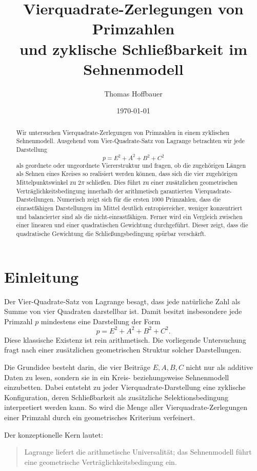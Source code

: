 \documentclass[11pt,a4paper]{article}
\title{Vierquadrate-Zerlegungen von Primzahlen\\
	und zyklische Schließbarkeit im Sehnenmodell}
\author{Thomas Hoffbauer}
\date{\today}
\theoremstyle{remark}
\begin{document}
	\maketitle
	
	\begin{abstract}
		Wir untersuchen Vierquadrate-Zerlegungen von Primzahlen in einem zyklischen Sehnenmodell. 
		Ausgehend vom Vier-Quadrate-Satz von Lagrange betrachten wir jede Darstellung
		\[
		p = E^2 + A^2 + B^2 + C^2
		\]
		als geordnete oder ungeordnete Viererstruktur und fragen, ob die zugehörigen Längen als Sehnen eines Kreises so realisiert werden können, dass sich die vier zugehörigen Mittelpunktswinkel zu \(2\pi\) schließen. 
		Dies führt zu einer zusätzlichen geometrischen Verträglichkeitsbedingung innerhalb der arithmetisch garantierten Vierquadrate-Darstellungen. 
		Numerisch zeigt sich für die ersten 1000 Primzahlen, dass die einrastfähigen Darstellungen im Mittel deutlich entropiereicher, weniger konzentriert und balancierter sind als die nicht-einrastfähigen. 
		Ferner wird ein Vergleich zwischen einer linearen und einer quadratischen Gewichtung durchgeführt. Dieser zeigt, dass die quadratische Gewichtung die Schließungsbedingung spürbar verschärft.
	\end{abstract}
	
	\section{Einleitung}
	
	Der Vier-Quadrate-Satz von Lagrange besagt, dass jede natürliche Zahl als Summe von vier Quadraten darstellbar ist. 
	Damit besitzt insbesondere jede Primzahl \(p\) mindestens eine Darstellung der Form
	\[
	p = E^2 + A^2 + B^2 + C^2.
	\]
	Diese klassische Existenz ist rein arithmetisch. 
	Die vorliegende Untersuchung fragt nach einer zusätzlichen geometrischen Struktur solcher Darstellungen.
	
	Die Grundidee besteht darin, die vier Beiträge \(E,A,B,C\) nicht nur als additive Daten zu lesen, sondern sie in ein Kreis- beziehungsweise Sehnenmodell einzubetten. 
	Dabei entsteht zu jeder Vierquadrate-Darstellung eine zyklische Konfiguration, deren Schließbarkeit als zusätzliche Selektionsbedingung interpretiert werden kann. 
	So wird die Menge aller Vierquadrate-Zerlegungen einer Primzahl durch ein geometrisches Kriterium verfeinert.
	
	Der konzeptionelle Kern lautet:
	
	\begin{quote}
		Lagrange liefert die arithmetische Universalität; das Sehnenmodell führt eine geometrische Verträglichkeitsbedingung ein.
	\end{quote}
	
\end{document}
